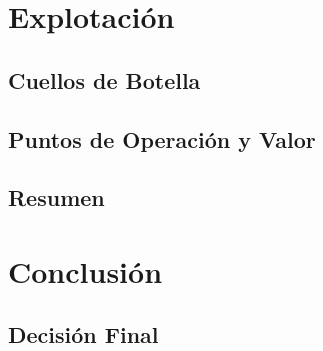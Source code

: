 \documentclass[aspectratio=169,9pt]{beamer}
\begin{document}
\section{Explotación}
\subsection{Cuellos de Botella}

\subsection{Puntos de Operación y Valor}

\subsection{Resumen}


\section{Conclusión}
\subsection{Decisión Final}

\end{document}
